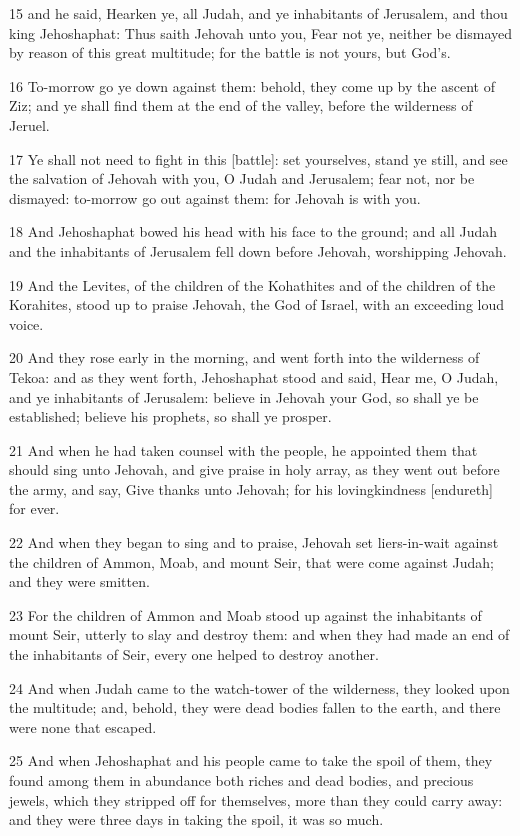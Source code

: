 \par 15 and he said, Hearken ye, all Judah, and ye inhabitants of Jerusalem, and thou king Jehoshaphat: Thus saith Jehovah unto you, Fear not ye, neither be dismayed by reason of this great multitude; for the battle is not yours, but God's.
\par 16 To-morrow go ye down against them: behold, they come up by the ascent of Ziz; and ye shall find them at the end of the valley, before the wilderness of Jeruel.
\par 17 Ye shall not need to fight in this [battle]: set yourselves, stand ye still, and see the salvation of Jehovah with you, O Judah and Jerusalem; fear not, nor be dismayed: to-morrow go out against them: for Jehovah is with you.
\par 18 And Jehoshaphat bowed his head with his face to the ground; and all Judah and the inhabitants of Jerusalem fell down before Jehovah, worshipping Jehovah.
\par 19 And the Levites, of the children of the Kohathites and of the children of the Korahites, stood up to praise Jehovah, the God of Israel, with an exceeding loud voice.
\par 20 And they rose early in the morning, and went forth into the wilderness of Tekoa: and as they went forth, Jehoshaphat stood and said, Hear me, O Judah, and ye inhabitants of Jerusalem: believe in Jehovah your God, so shall ye be established; believe his prophets, so shall ye prosper.
\par 21 And when he had taken counsel with the people, he appointed them that should sing unto Jehovah, and give praise in holy array, as they went out before the army, and say, Give thanks unto Jehovah; for his lovingkindness [endureth] for ever.
\par 22 And when they began to sing and to praise, Jehovah set liers-in-wait against the children of Ammon, Moab, and mount Seir, that were come against Judah; and they were smitten.
\par 23 For the children of Ammon and Moab stood up against the inhabitants of mount Seir, utterly to slay and destroy them: and when they had made an end of the inhabitants of Seir, every one helped to destroy another.
\par 24 And when Judah came to the watch-tower of the wilderness, they looked upon the multitude; and, behold, they were dead bodies fallen to the earth, and there were none that escaped.
\par 25 And when Jehoshaphat and his people came to take the spoil of them, they found among them in abundance both riches and dead bodies, and precious jewels, which they stripped off for themselves, more than they could carry away: and they were three days in taking the spoil, it was so much.
